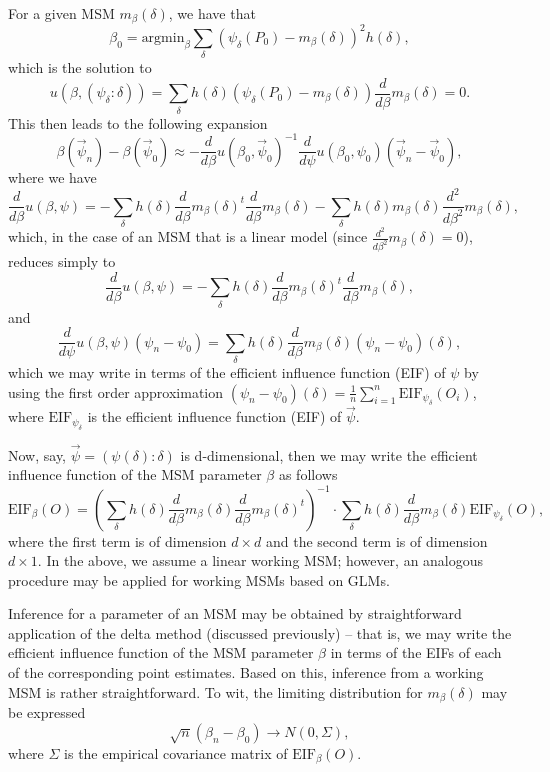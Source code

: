 \documentclass[12pt, krantz2,]{krantz}
\theoremstyle{definition}
\theoremstyle{definition}
\theoremstyle{definition}
\newcommand{\1}{\mathbbm{1}}
\begin{document}
For a given MSM \(m_{\beta}(\delta)\), we have that
\[\beta_0 = \text{argmin}_{\beta} \sum_{\delta}(\psi_{\delta}(P_0) -
m_{\beta}(\delta))^2 h(\delta),\]
which is the solution to
\[u(\beta, (\psi_{\delta}: \delta)) = \sum_{\delta}h(\delta)
\left(\psi_{\delta}(P_0) - m_{\beta}(\delta) \right) \frac{d}{d\beta}
m_{\beta}(\delta) = 0.\]
This then leads to the following expansion
\[\beta(\vec{\psi}_n) - \beta(\vec{\psi}_0) \approx -\frac{d}{d\beta}
  u(\beta_0, \vec{\psi}_0)^{-1} \frac{d}{d\psi} u(\beta_0, \psi_0)
  (\vec{\psi}_n - \vec{\psi}_0),\]
where we have
\[\frac{d}{d\beta} u(\beta, \psi) = -\sum_{\delta} h(\delta) \frac{d}{d\beta}
m_{\beta}(\delta)^t \frac{d}{d\beta} m_{\beta}(\delta)
-\sum_{\delta} h(\delta) m_{\beta}(\delta) \frac{d^2}{d\beta^2}
m_{\beta}(\delta),\]
which, in the case of an MSM that is a linear model (since
\(\frac{d^2}{d\beta^2} m_{\beta}(\delta) = 0\)), reduces simply to
\[\frac{d}{d\beta} u(\beta, \psi) = -\sum_{\delta} h(\delta) \frac{d}{d\beta}
m_{\beta}(\delta)^t \frac{d}{d\beta} m_{\beta}(\delta),\]
and
\[\frac{d}{d\psi}u(\beta, \psi)(\psi_n - \psi_0) = \sum_{\delta} h(\delta)
\frac{d}{d\beta} m_{\beta}(\delta) (\psi_n - \psi_0)(\delta),\]
which we may write in terms of the efficient influence function (EIF) of \(\psi\)
by using the first order approximation \((\psi_n - \psi_0)(\delta) = \frac{1}{n}\sum_{i = 1}^n \text{EIF}_{\psi_{\delta}}(O_i)\),
where \(\text{EIF}_{\psi_{\delta}}\) is the efficient influence function (EIF) of
\(\vec{\psi}\).

Now, say, \(\vec{\psi} = (\psi(\delta): \delta)\) is d-dimensional, then we may
write the efficient influence function of the MSM parameter \(\beta\) as follows
\[\text{EIF}_{\beta}(O) = \left(\sum_{\delta} h(\delta) \frac{d}{d\beta}
m_{\beta}(\delta) \frac{d}{d\beta} m_{\beta}(\delta)^t \right)^{-1} \cdot
\sum_{\delta} h(\delta) \frac{d}{d\beta} m_{\beta}(\delta)
\text{EIF}_{\psi_{\delta}}(O),\] where the first term is of dimension
\(d \times d\) and the second term is of dimension \(d \times 1\). In the above, we
assume a linear working MSM; however, an analogous procedure may be applied for
working MSMs based on GLMs.

Inference for a parameter of an MSM may be obtained by straightforward
application of the delta method (discussed previously) -- that is, we may
write the efficient influence function of the MSM parameter \(\beta\) in terms of
the EIFs of each of the corresponding point estimates. Based on this, inference
from a working MSM is rather straightforward. To wit, the limiting distribution
for \(m_{\beta}(\delta)\) may be expressed \[\sqrt{n}(\beta_n - \beta_0) \to N(0,
\Sigma),\] where \(\Sigma\) is the empirical covariance matrix of
\(\text{EIF}_{\beta}(O)\).
\end{document}
